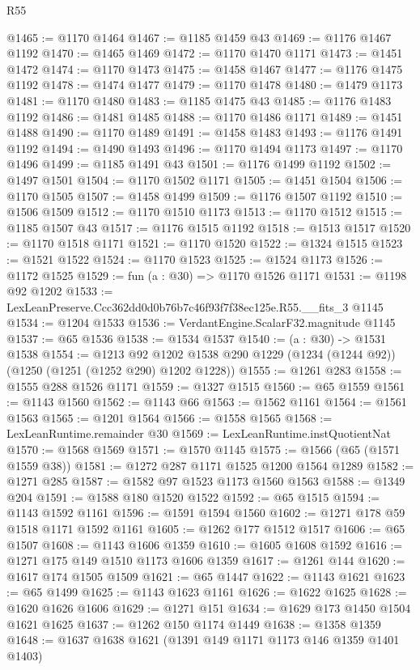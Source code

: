 \begin{lexlean}{R55}
\begin{coremodule}
@1465 := @1170 @1464
@1467 := @1185 @1459 @43
@1469 := @1176 @1467 @1192
@1470 := @1465 @1469
@1472 := @1170 @1470 @1171
@1473 := @1451 @1472
@1474 := @1170 @1473
@1475 := @1458 @1467
@1477 := @1176 @1475 @1192
@1478 := @1474 @1477
@1479 := @1170 @1478
@1480 := @1479 @1173
@1481 := @1170 @1480
@1483 := @1185 @1475 @43
@1485 := @1176 @1483 @1192
@1486 := @1481 @1485
@1488 := @1170 @1486 @1171
@1489 := @1451 @1488
@1490 := @1170 @1489
@1491 := @1458 @1483
@1493 := @1176 @1491 @1192
@1494 := @1490 @1493
@1496 := @1170 @1494 @1173
@1497 := @1170 @1496
@1499 := @1185 @1491 @43
@1501 := @1176 @1499 @1192
@1502 := @1497 @1501
@1504 := @1170 @1502 @1171
@1505 := @1451 @1504
@1506 := @1170 @1505
@1507 := @1458 @1499
@1509 := @1176 @1507 @1192
@1510 := @1506 @1509
@1512 := @1170 @1510 @1173
@1513 := @1170 @1512
@1515 := @1185 @1507 @43
@1517 := @1176 @1515 @1192
@1518 := @1513 @1517
@1520 := @1170 @1518 @1171
@1521 := @1170 @1520
@1522 := @1324 @1515
@1523 := @1521 @1522
@1524 := @1170 @1523
@1525 := @1524 @1173
@1526 := @1172 @1525
@1529 := fun (a : @30) => @1170 @1526 @1171
@1531 := @1198 @92 @1202
@1533 := LexLeanPreserve.Ccc362dd0d0b76b7c46f93f7f38ec125e.R55.__fits_3 @1145
@1534 := @1204 @1533
@1536 := VerdantEngine.ScalarF32.magnitude @1145
@1537 := @65 @1536
@1538 := @1534 @1537
@1540 := (a : @30) -> @1531 @1538
@1554 := @1213
    @92
    @1202
    @1538
    @290
    @1229
    (@1234 (@1244 @92))
    (@1250 (@1251 (@1252 @290) @1202 @1228))
@1555 := @1261 @283
@1558 := @1555 @288 @1526 @1171
@1559 := @1327 @1515
@1560 := @65 @1559
@1561 := @1143 @1560
@1562 := @1143 @66
@1563 := @1562 @1161
@1564 := @1561 @1563
@1565 := @1201 @1564
@1566 := @1558 @1565
@1568 := LexLeanRuntime.remainder @30
@1569 := LexLeanRuntime.instQuotientNat
@1570 := @1568 @1569
@1571 := @1570 @1145
@1575 := @1566 (@65 (@1571 @1559 @38))
@1581 := @1272 @287 @1171 @1525 @1200 @1564 @1289
@1582 := @1271 @285
@1587 := @1582 @97 @1523 @1173 @1560 @1563
@1588 := @1349 @204
@1591 := @1588 @180 @1520 @1522
@1592 := @65 @1515
@1594 := @1143 @1592 @1161
@1596 := @1591 @1594 @1560
@1602 := @1271 @178 @59 @1518 @1171 @1592 @1161
@1605 := @1262 @177 @1512 @1517
@1606 := @65 @1507
@1608 := @1143 @1606 @1359
@1610 := @1605 @1608 @1592
@1616 := @1271 @175 @149 @1510 @1173 @1606 @1359
@1617 := @1261 @144
@1620 := @1617 @174 @1505 @1509
@1621 := @65 @1447
@1622 := @1143 @1621
@1623 := @65 @1499
@1625 := @1143 @1623 @1161
@1626 := @1622 @1625
@1628 := @1620 @1626 @1606
@1629 := @1271 @151
@1634 := @1629 @173 @1450 @1504 @1621 @1625
@1637 := @1262 @150 @1174 @1449
@1638 := @1358 @1359
@1648 := @1637 @1638 @1621 (@1391 @149 @1171 @1173 @146 @1359 @1401 @1403)

\end{coremodule}
\end{lexlean}
